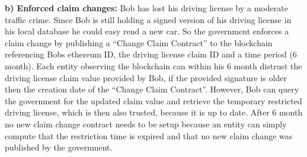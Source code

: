 \textbf{b) Enforced claim changes:}
Bob has lost his driving license by a moderate traffic crime. Since Bob is still holding a signed version of his driving license in his local database he could easy rend a new car. So the government enforces a claim change by publishing a “Change Claim Contract” to the blockchain referencing Bobs ethereum ID, the driving license claim ID and a time period (6 month). Each entity observing the blockchain can within his 6 month distrust the driving license claim value provided by Bob, if the provided signature is older then the creation date of the “Change Claim Contract”. However, Bob can query the government for the updated claim value and retrieve the temporary restricted driving license, which is then also trusted, because it is up to date. After 6 month no new claim change contract needs to be setup because an entity can simply compute that the restriction time is expired and that no new claim change was published by the government. 
